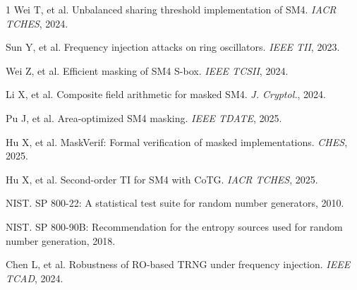 \documentclass[journal]{IEEEtran}
\begin{document}
\begin{thebibliography}{1}
Wei T, et al. Unbalanced sharing threshold implementation of SM4. \emph{IACR TCHES}, 2024.

Sun Y, et al. Frequency injection attacks on ring oscillators. \emph{IEEE TII}, 2023.

Wei Z, et al. Efficient masking of SM4 S-box. \emph{IEEE TCSII}, 2024.

Li X, et al. Composite field arithmetic for masked SM4. \emph{J. Cryptol.}, 2024.

Pu J, et al. Area-optimized SM4 masking. \emph{IEEE TDATE}, 2025.

Hu X, et al. MaskVerif: Formal verification of masked implementations. \emph{CHES}, 2025.

Hu X, et al. Second-order TI for SM4 with CoTG. \emph{IACR TCHES}, 2025.

NIST. SP 800-22: A statistical test suite for random number generators, 2010.

NIST. SP 800-90B: Recommendation for the entropy sources used for random number generation, 2018.

Chen L, et al. Robustness of RO-based TRNG under frequency injection. \emph{IEEE TCAD}, 2024.
\end{thebibliography}
\end{document}
